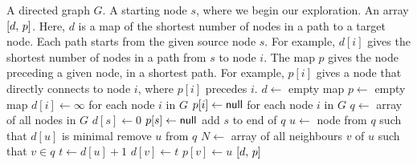
\begin{algorithmic}[1]
\Require A directed graph $G$.  A starting node $s$, where we begin
our exploration.
\Ensure An array $\left[ {d},\, {p} \right]$.  Here, $d$ is a map of the shortest
number of nodes in a path to a target node.  Each path starts from the
given source node $s$.  For example, $d[i]$ gives the shortest number
of nodes in a path from $s$ to node $i$.  The map $p$ gives the node
preceding a given node, in a shortest path.  For example, $p[i]$ gives
a node that directly connects to node $i$, where $p[i]$ precedes $i$.
\State $d \gets$ empty map
\State $p \gets$ empty map
\State $d[i] \gets \infty$ for each node $i$ in $G$
\State $p[i] \gets {\sf {null}}$ for each node $i$ in $G$
\State $q \gets$ array of all nodes in $G$
\State $d[s] \gets 0$
\State $p[s] \gets {\sf {null}}$
\State add $s$ to end of $q$
  \State $u \gets$ node from $q$ such that $d[u]$ is minimal
  \State remove $u$ from $q$
  \State $N \gets $ array of all neighbours $v$ of $u$ such that $v \in q$
    \State $t \gets d[u] + 1$
      \State $d[v] \gets t$
      \State $p[v] \gets u$
    \EndIf
  \EndFor
\EndWhile
\State \Return $\left[ {d},\, {p} \right]$
\end{algorithmic}
